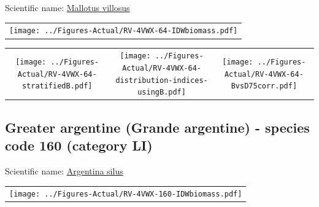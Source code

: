 \documentclass[12pt]{article}\usepackage[]{graphicx}\usepackage[]{color}
\begin{document}

Scientific name: \href{http://www.marinespecies.org/aphia.php?p=taxdetails\&id=126735}{Mallotus villosus} \newline
\begin{minipage}{1.0\textwidth}
 \begin{tabular}{c}
\texttt{[image: ../Figures-Actual/RV-4VWX-64-IDWbiomass.pdf]} \\ 
\end{tabular} 
\end{minipage}
\newline

\vspace{1cm}
\begin{minipage}{1.0\textwidth}
 \begin{tabular}{ccc}
\texttt{[image: ../Figures-Actual/RV-4VWX-64-stratifiedB.pdf]} & 
\texttt{[image: ../Figures-Actual/RV-4VWX-64-distribution-indices-usingB.pdf]} & 
\texttt{[image: ../Figures-Actual/RV-4VWX-64-BvsD75corr.pdf]} \\ 
\end{tabular} 
\end{minipage}
\clearpage

\renewcommand\thefigure{\thesubsection\Alph{figure}}

\setcounter{figure}{0}

\hypertarget{sec:160}{%
\subsection{Greater argentine (Grande argentine) - species code 160 (category LI)}\label{sec:160}}

  


Scientific name: \href{http://www.marinespecies.org/aphia.php?p=taxdetails\&id=126715}{Argentina silus} \newline
\begin{minipage}{1.0\textwidth}
 \begin{tabular}{c}
\texttt{[image: ../Figures-Actual/RV-4VWX-160-IDWbiomass.pdf]} \\ 
\end{tabular} 
\end{minipage}
\newline
\end{document}
